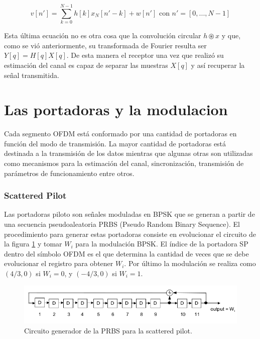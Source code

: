\begin{equation}
v[n'] = \sum_{k = 0}^{N-1}h[k]x_N[n'- k] + w[n'] \text{ con } n' = [0, ..., N-1]
\end{equation}

Esta última ecuación no es otra cosa que la convolución circular $h \circledast x$ y que, como se vió anteriormente, su transformada de Fourier resulta ser $Y[q] = H[q]X[q]$.
De esta manera el receptor una vez que realizó su estimación del canal es capaz de separar las muestras $X[q]$ y así recuperar la señal transmitida.

\section{Las portadoras y la modulacion}

Cada segmento OFDM está conformado por una cantidad de portadoras en función del modo de transmisión. La mayor cantidad de portadoras está destinada a la transmisión de los datos mientras que algunas otras son utilizadas como mecanismos para la estimación del canal, sincronización, transmisión de parámetros de funcionamiento entre otros.



\subsubsection{Scattered Pilot}
Las portadoras piloto son señales moduladas en BPSK que se generan a partir de una secuencia pseudoaleatoria PRBS (Pseudo Random Binary Sequence). El procedimiento para generar estas portadoras consiste en evolucionar el circuito de la figura \ref{f:prbs} y tomar $W_i$ para la modulación BPSK. El índice de la portadora SP dentro del símbolo OFDM es el que determina la cantidad de veces que se debe evolucionar el registro para obtener $W_i$.
Por último la modulación se realiza como $(4/3, 0)$ si $W_i = 0$, y $(-4/3, 0)$ si $W_i = 1$.

\begin{figure}[h!]
	\centering
	\includegraphics[scale=0.55]{figuras/cap03/circuito_prbs}
	\caption{\label{f:prbs} Circuito generador de la PRBS para la scattered pilot.}
\end{figure}

